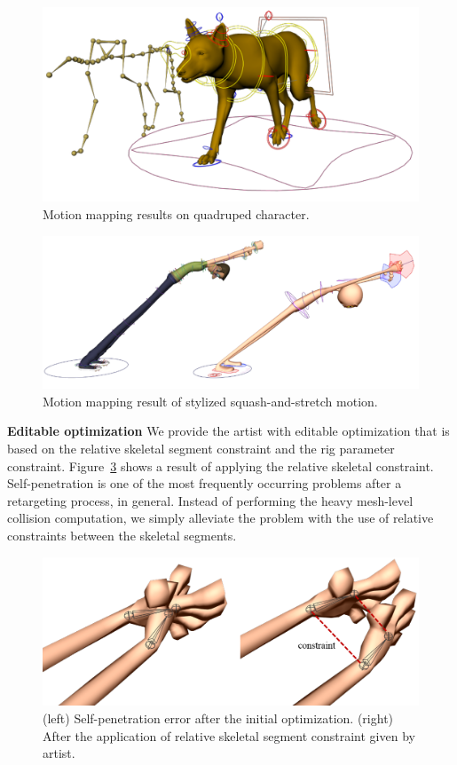 \begin{figure}[ht]
  \centering
  \includegraphics[width=.9\linewidth]{images/dogResult}
  \caption{Motion mapping results on quadruped character. }
  \label{fig:dogResult}
\end{figure}

\begin{figure}[ht]
  \centering
  \includegraphics[width=.9\linewidth]{images/squashResult}
  \caption{Motion mapping result of stylized squash-and-stretch motion. }
  \label{fig:squashResult}
\end{figure}


\textbf{Editable optimization}
We provide the artist with editable optimization that is based on the relative skeletal segment constraint and the rig parameter constraint. Figure~\ref{fig:selfPenetration} shows a result of applying the relative skeletal constraint. Self-penetration is one of the most frequently occurring problems after a retargeting process, in general. Instead of performing the heavy mesh-level collision computation, we simply alleviate the problem with the use of relative constraints between the skeletal segments. 

\begin{figure}[ht]
  \centering
  \includegraphics[width=.9\linewidth]{images/selfPenetration}
  \caption{(left) Self-penetration error after the initial optimization. (right) After the application of relative skeletal segment constraint given by artist.}
  \label{fig:selfPenetration}
\end{figure}

